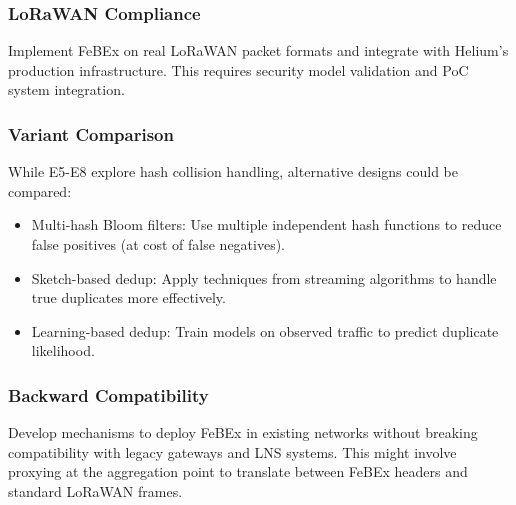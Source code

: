 \subsubsection{LoRaWAN Compliance}

Implement FeBEx on real LoRaWAN packet formats and integrate with Helium's production infrastructure. This requires security model validation and PoC system integration.

\subsubsection{Variant Comparison}

While E5-E8 explore hash collision handling, alternative designs could be compared:
\begin{itemize}
    \item Multi-hash Bloom filters: Use multiple independent hash functions to reduce false positives (at cost of false negatives).
    \item Sketch-based dedup: Apply techniques from streaming algorithms to handle true duplicates more effectively.
    \item Learning-based dedup: Train models on observed traffic to predict duplicate likelihood.
\end{itemize}

\subsubsection{Backward Compatibility}

Develop mechanisms to deploy FeBEx in existing networks without breaking compatibility with legacy gateways and LNS systems. This might involve proxying at the aggregation point to translate between FeBEx headers and standard LoRaWAN frames.
